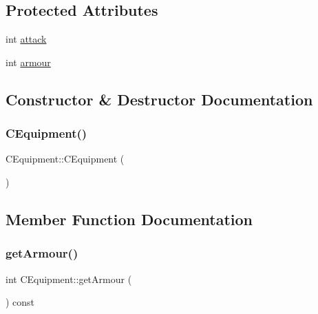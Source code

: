 \subsection*{Protected Attributes}
\begin{DoxyCompactItemize}
\item 
int \mbox{\hyperlink{class_c_equipment_a84182e68749a37eb8eb9ec97cded148b}{attack}}
\item 
int \mbox{\hyperlink{class_c_equipment_ac81cce3ea702ab56bf778b8ed9e650c7}{armour}}
\end{DoxyCompactItemize}


\subsection{Constructor \& Destructor Documentation}
\mbox{\label{class_c_equipment_a6028a9984cacac2d2809eee487f22b4e}} 
\subsubsection{\texorpdfstring{C\+Equipment()}{CEquipment()}}
{\footnotesize\ttfamily C\+Equipment\+::\+C\+Equipment (\begin{DoxyParamCaption}{ }\end{DoxyParamCaption})\hspace{0.3cm}{\ttfamily [inline]}}



\subsection{Member Function Documentation}
\mbox{\label{class_c_equipment_a27e962aead56bb39886acc86c17b7478}} 
\subsubsection{\texorpdfstring{get\+Armour()}{getArmour()}}
{\footnotesize\ttfamily int C\+Equipment\+::get\+Armour (\begin{DoxyParamCaption}{ }\end{DoxyParamCaption}) const\hspace{0.3cm}{\ttfamily [inline]}}

